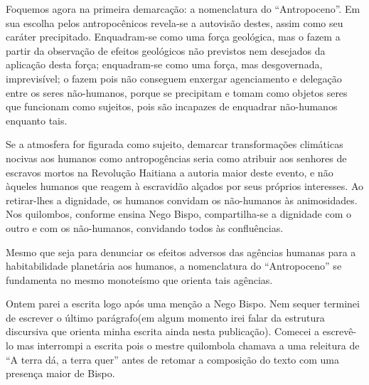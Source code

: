 Foquemos agora na primeira demarcação: a nomenclatura do \enquote{Antropoceno}. Em sua escolha pelos antropocênicos revela-se a autovisão destes, assim como seu caráter precipitado. Enquadram-se como uma força geológica, mas o fazem a partir da observação de efeitos geológicos não previstos nem desejados da aplicação desta força; enquadram-se como uma força, mas desgovernada, imprevisível; o fazem pois não conseguem enxergar agenciamento e delegação entre os seres não-humanos, porque se precipitam e tomam como objetos seres que funcionam como sujeitos, pois são incapazes de enquadrar não-humanos enquanto tais.

Se a atmosfera for figurada como sujeito, demarcar  transformações climáticas  nocivas  aos humanos como  antropogências seria como atribuir aos senhores de escravos mortos na Revolução Haitiana a autoria maior deste evento, e não àqueles humanos que reagem à  escravidão alçados por  seus próprios interesses.  Ao retirar-lhes a dignidade, os humanos convidam os não-humanos às animosidades. Nos quilombos, conforme ensina Nego Bispo, compartilha-se a dignidade com o outro e com os não-humanos, convidando todos às confluências.

Mesmo que seja para denunciar os efeitos  adversos das agências humanas para a habitabilidade planetária aos humanos, a nomenclatura do \enquote{Antropoceno} se fundamenta no mesmo monoteísmo que orienta tais agências.


Ontem parei a escrita logo após uma menção a Nego Bispo. Nem sequer terminei de escrever o último parágrafo(em algum momento irei falar da  estrutura  discursiva que orienta minha escrita ainda nesta publicação). Comecei a escrevê-lo  mas  interrompi a escrita pois o mestre quilombola chamava a uma releitura de \enquote{A terra dá, a terra quer} antes de retomar a composição do texto com uma presença maior de Bispo.

